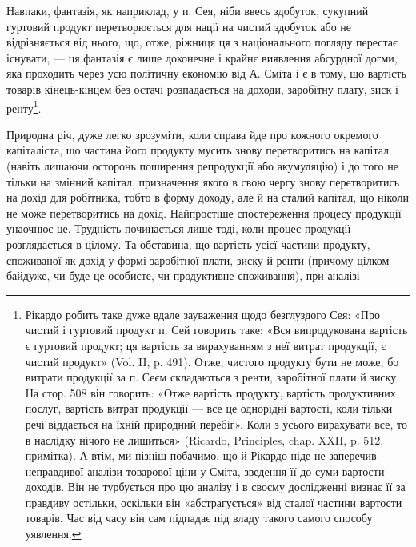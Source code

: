 Навпаки, фантазія, як наприклад, у п. Сея, ніби ввесь здобуток, сукупний
гуртовий продукт перетворюється для нації на чистий здобуток або не відрізняється
від нього, що, отже, ріжниця ця з національного погляду перестає існувати,
— ця фантазія є лише доконечне і крайнє виявлення абсурдної догми, яка
проходить через усю політичну економію від А. Сміта і є в тому, що вартість
товарів кінець-кінцем без остачі розпадається на доходи, заробітну плату,
зиск і ренту\footnote{
Рікардо робить таке дуже вдале зауваження щодо безглуздого Сея: «Про чистий і гуртовий продукт
п. Сей говорить таке: «Вся випродукована вартість є гуртовий продукт; ця вартість за вирахуванням з
неї витрат продукції, є чистий продукт» (Vol. II, p. 491). Отже, чистого продукту бути не може, бо
витрати продукції за п. Сеєм складаються з ренти, заробітної плати й зиску. На стор. 508 він
говорить: «Отже вартість продукту, вартість продуктивних послуг, вартість витрат продукції — все
це однорідні вартості, коли тільки речі віддається на їхній природний перебіг». Коли з усього
вирахувати все, то в наслідку нічого не лишиться» (Ricardo, Principles, chap. XXII, p. 512,
примітка). А втім, ми пізніш побачимо, що й Рікардо ніде не заперечив неправдивої аналізи товарової
ціни у Сміта, зведення її до суми вартости доходів. Він не турбується про цю аналізу і в своєму
дослідженні визнає її за правдиву остільки, оскільки він «абстрагується» від сталої частини вартости
товарів. Час від часу він сам підпадає під владу такого самого способу уявлення.
}.

Природна річ, дуже легко зрозуміти, коли справа йде про кожного окремого
капіталіста, що частина його продукту мусить знову перетворитись на
капітал (навіть лишаючи осторонь поширення репродукції або акумуляцію) і до
того не тільки на змінний капітал, призначення якого в свою чергу знову перетворитись
на дохід для робітника, тобто в форму доходу, але й на сталий
капітал, що ніколи не може перетворитись на дохід. Найпростіше спостереження
процесу продукції унаочнює це. Трудність починається лише тоді, коли процес
продукції розглядається в цілому. Та обставина, що вартість усієї частини продукту,
споживаної як дохід у формі заробітної плати, зиску й ренти (причому
цілком байдуже, чи буде це особисте, чи продуктивне споживання), при аналізі
\parbreak{}  %
